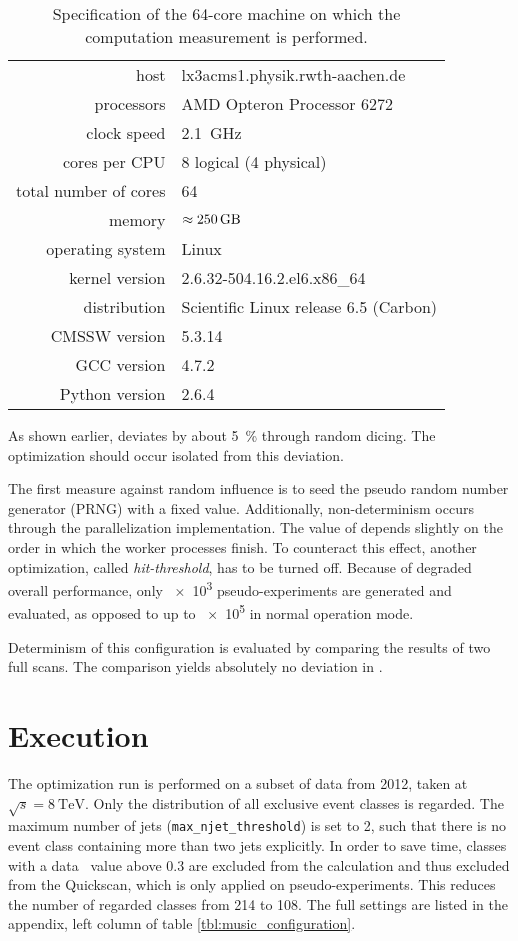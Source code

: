 \begin{table}
	\centering
	\begin{tabular}{r|l|}
		\cline{2-2}
		host & lx3acms1.physik.rwth-aachen.de \\
		\cline{2-2}
		processors & AMD Opteron Processor 6272 \\
		clock speed & \SI{2.1}{\giga\hertz} \\
		cores per CPU & 8 logical (4 physical) \\
		total number of cores & 64 \\
		memory & $\approx \SI{250}{\giga\byte}$ \\
		\cline{2-2}
		operating system & Linux \\
		kernel version & 2.6.32-504.16.2.el6.x86\_64 \\
		distribution & Scientific Linux release 6.5 (Carbon) \\
		\cline{2-2}
		CMSSW version & 5.3.14 \\
		GCC version & 4.7.2 \\
		Python version & 2.6.4 \\
		\cline{2-2}
	\end{tabular}
	\caption{Specification of the 64-core machine on which the computation measurement is performed.}
	\label{tbl:music_machine}
\end{table}

As shown earlier, \sigmarel deviates by about \SI{5}{\percent} through random dicing. The optimization should occur isolated from this deviation. 

The first measure against random influence is to seed the pseudo random number generator (PRNG) with a fixed value. Additionally, non-determinism occurs through the parallelization implementation. The value of \ptilde depends slightly on the order in which the worker processes finish.
To counteract this effect, another optimization, called \emph{hit-threshold}, has to be turned off. Because of degraded overall performance, only \num{e3} pseudo-experiments are generated and evaluated, as opposed to up to \num{e5} in normal operation mode.

Determinism of this configuration is evaluated by comparing the results of two full scans. The comparison yields absolutely no deviation in \sigmarel.

\section{Execution}
The optimization run is performed on a subset of data from 2012, taken at ${\sqrt{s} = \SI{8}{\TeV}}$. Only the \sumpT distribution of all exclusive event classes is regarded. The maximum number of jets (\texttt{max\_njet\_threshold}) is set to \num{2}, such that there is no event class containing more than two jets explicitly. 
In order to save time, classes with a data \p~value above \num{0.3} are excluded from the \ptilde calculation and thus excluded from the Quickscan, which is only applied on pseudo-experiments. This reduces the number of regarded classes from \num{214} to \num{108}. The full settings are listed in the appendix, left column of table \ref{tbl:music_configuration}.

